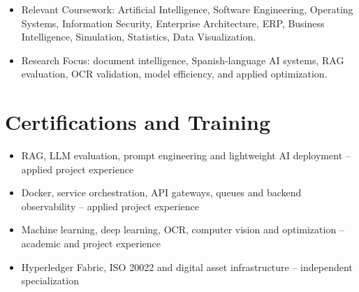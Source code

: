 \documentclass[10pt,letterpaper]{article}
\begin{document}
\begin{itemize}
    \item Relevant Coursework: Artificial Intelligence, Software Engineering, Operating Systems, Information Security, Enterprise Architecture, ERP, Business Intelligence, Simulation, Statistics, Data Visualization.
    \item Research Focus: document intelligence, Spanish-language AI systems, RAG evaluation, OCR validation, model efficiency, and applied optimization.
\end{itemize}


\section{Certifications and Training}

\begin{itemize}
    \item RAG, LLM evaluation, prompt engineering and lightweight AI deployment -- applied project experience
    \item Docker, service orchestration, API gateways, queues and backend observability -- applied project experience
    \item Machine learning, deep learning, OCR, computer vision and optimization -- academic and project experience
    \item Hyperledger Fabric, ISO 20022 and digital asset infrastructure -- independent specialization
\end{itemize}
\end{document}
